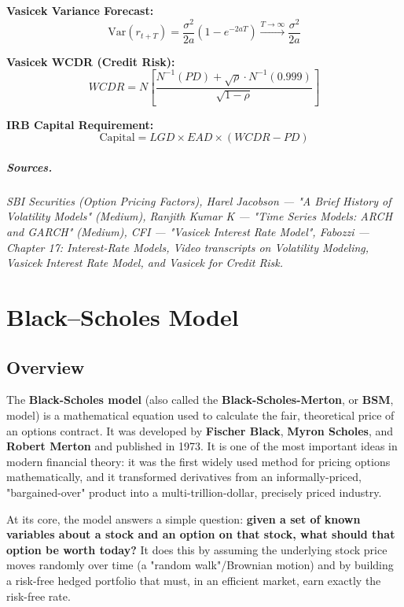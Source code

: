 \documentclass[12pt,openany]{book}
\theoremstyle{definition}
\theoremstyle{remark}
\begin{document}
\textbf{Vasicek Variance Forecast:} \[
\text{Var}(r_{t+T}) = \frac{\sigma^2}{2a}(1 - e^{-2aT}) \xrightarrow{T \to \infty} \frac{\sigma^2}{2a}
\]

\textbf{Vasicek WCDR (Credit Risk):} \[
WCDR = N\left[\frac{N^{-1}(PD) + \sqrt{\rho} \cdot N^{-1}(0.999)}{\sqrt{1-\rho}}\right]
\]

\textbf{IRB Capital Requirement:} \[
\text{Capital} = LGD \times EAD \times (WCDR - PD)
\]

\medskip
\paragraph{Sources.}\emph{ SBI Securities (Option Pricing Factors), Harel Jacobson --- "A Brief History of Volatility Models" (Medium), Ranjith Kumar K --- "Time Series Models: ARCH and GARCH" (Medium), CFI --- "Vasicek Interest Rate Model", Fabozzi --- Chapter 17: Interest-Rate Models, Video transcripts on Volatility Modeling, Vasicek Interest Rate Model, and Vasicek for Credit Risk.}



\chapter{Black--Scholes Model}

\section{Overview}

The \textbf{Black-Scholes model} (also called the \textbf{Black-Scholes-Merton}, or \textbf{BSM}, model) is a mathematical equation used to calculate the fair, theoretical price of an options contract. It was developed by \textbf{Fischer Black}, \textbf{Myron Scholes}, and \textbf{Robert Merton} and published in 1973. It is one of the most important ideas in modern financial theory: it was the first widely used method for pricing options mathematically, and it transformed derivatives from an informally-priced, "bargained-over" product into a multi-trillion-dollar, precisely priced industry.

At its core, the model answers a simple question: \textbf{given a set of known variables about a stock and an option on that stock, what should that option be worth today?} It does this by assuming the underlying stock price moves randomly over time (a "random walk"/Brownian motion) and by building a risk-free hedged portfolio that must, in an efficient market, earn exactly the risk-free rate.
\end{document}

